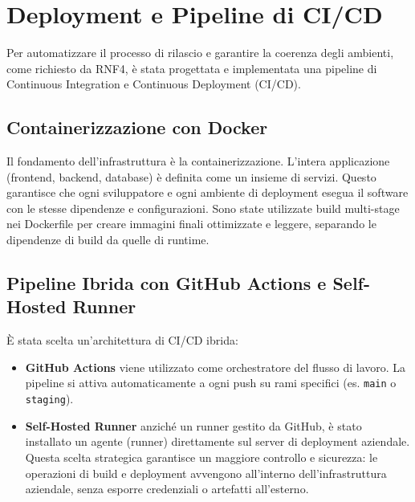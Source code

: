 \documentclass[12pt,a4paper,openright,twoside]{book}
\begin{document}
\section{Deployment e Pipeline di CI/CD}
\label{sec:ci_cd}
Per automatizzare il processo di rilascio e garantire la coerenza degli ambienti, come richiesto da RNF4, è stata progettata e implementata una pipeline di Continuous Integration e Continuous Deployment (CI/CD).

\subsection{Containerizzazione con Docker}
Il fondamento dell'infrastruttura è la containerizzazione. L'intera applicazione (frontend, backend, database) è definita come un insieme di servizi. Questo garantisce che ogni sviluppatore e ogni ambiente di deployment esegua il software con le stesse dipendenze e configurazioni. Sono state utilizzate build multi-stage nei Dockerfile per creare immagini finali ottimizzate e leggere, separando le dipendenze di build da quelle di runtime.

\subsection{Pipeline Ibrida con GitHub Actions e Self-Hosted Runner}
È stata scelta un'architettura di CI/CD ibrida:
\begin{itemize}
    \item \textbf{GitHub Actions} viene utilizzato come orchestratore del flusso di lavoro. La pipeline si attiva automaticamente a ogni push su rami specifici (es. \texttt{main} o \texttt{staging}).
    \item \textbf{Self-Hosted Runner} anziché un runner gestito da GitHub, è stato installato un agente (runner) direttamente sul server di deployment aziendale. Questa scelta strategica garantisce un maggiore controllo e sicurezza: le operazioni di build e deployment avvengono all'interno dell'infrastruttura aziendale, senza esporre credenziali o artefatti all'esterno.
\end{itemize}
\end{document}
